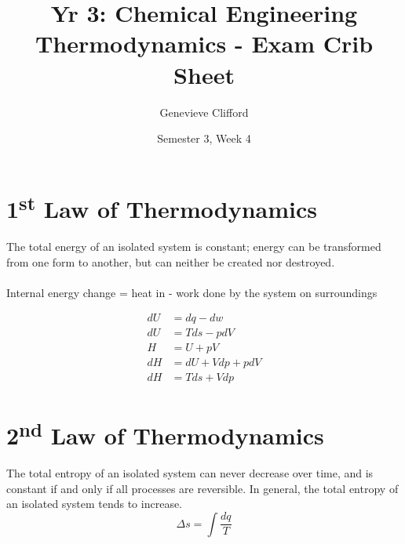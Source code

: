 \documentclass[10pt, oneside, twocolumn]{article}
\title{Yr 3: Chemical Engineering Thermodynamics - Exam Crib Sheet}
\author{Genevieve Clifford}
\date{Semester 3, Week 4}
\numberwithin{equation}{section}
\begin{document}
	\maketitle
	\section{1\textsuperscript{st} Law of Thermodynamics}
		The total energy of an isolated system is constant; energy can be transformed from one form to another, but can neither be created nor destroyed.
		\\\\
		Internal energy change = heat in - work done by the system on surroundings
		
		\begin{align*}
		dU&=dq-dw\\
		dU&=Tds-pdV\\
		H&=U+pV\\
		dH&=dU+Vdp+pdV\\
		dH&=Tds+Vdp
		\end{align*}
	\section{2\textsuperscript{nd} Law of Thermodynamics}
		The total entropy of an isolated system can never decrease over time, and is constant if and only if all processes are reversible. In general, the total entropy of an isolated system tends to increase.
		\begin{equation}
		\Delta s=\int \frac{dq}{T}
		\end{equation}
\end{document}
